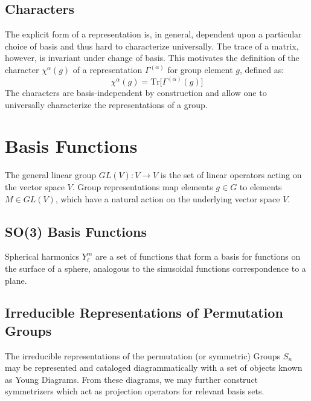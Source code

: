 \documentclass[]{report}
\begin{document}
\subsection{Characters}
The explicit form of a representation is, in general, dependent upon a particular choice of basis and thus hard to characterize universally. The trace of a matrix, however, is invariant under change of basis. This motivates the definition of the character $\chi^{\alpha}(g)$ of a representation $\Gamma^{(\alpha)}$ for group element $g$, defined as:
\begin{equation}
	\chi^{\alpha}(g)=\text{Tr}\Big[\Gamma^{(\alpha)}(g)\Big]
\end{equation}
The characters are basis-independent by construction and allow one to universally characterize the representations of a group.
	
\section{Basis Functions}
The general linear group $GL(V):V\rightarrow V$ is the set of linear operators acting on the vector space $V$. Group representations map elements $g\in G$ to elements $M\in GL(V)$, which have a natural action on the underlying vector space $V$.

\subsection{SO(3) Basis Functions}
Spherical harmonics $Y_{\ell}^m$ are a set of functions that form a basis for functions on the surface of a sphere, analogous to the sinusoidal functions correspondence to a plane.

\subsection{Irreducible Representations of Permutation Groups}
The irreducible representations of the permutation (or symmetric) Groups $S_n$ may be represented and cataloged diagrammatically with a set of objects known as Young Diagrams. From these diagrams, we may further construct symmetrizers which act as projection operators for relevant basis sets. 
\end{document}

